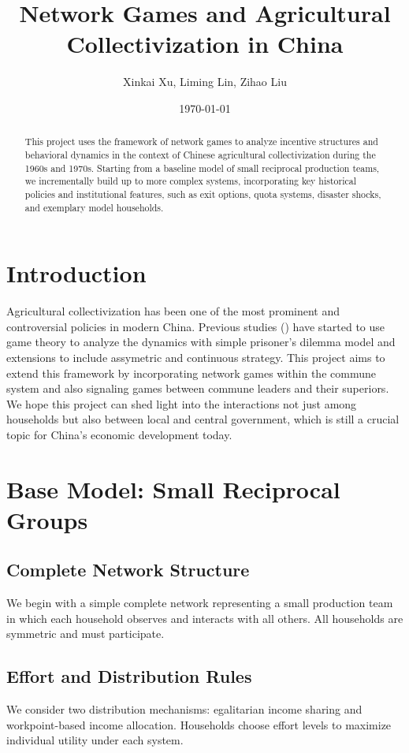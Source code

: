 \documentclass[12pt]{article}
\title{Network Games and Agricultural Collectivization in China}
\author{Xinkai Xu, Liming Lin, Zihao Liu}
\date{\today}
\begin{document}
\maketitle
\onehalfspacing

\begin{abstract}
This project uses the framework of network games to analyze incentive structures and behavioral dynamics in the context of Chinese agricultural collectivization during the 1960s and 1970s. Starting from a baseline model of small reciprocal production teams, we incrementally build up to more complex systems, incorporating key historical policies and institutional features, such as exit options, quota systems, disaster shocks, and exemplary model households.
\end{abstract}

\section{Introduction}
Agricultural collectivization has been one of the most prominent and controversial policies in modern China. Previous studies (\cite{chinnDiligenceLazinessChinese1980, nitzanDiligenceLazinessChinese1987}) have started to use game theory to analyze the dynamics with simple prisoner's dilemma model and extensions to include assymetric and continuous strategy. This project aims to extend this framework by incorporating network games within the commune system and also signaling games between commune leaders and their superiors. We hope this project can shed light into the interactions not just among households but also between local and central government, which is still a crucial topic for China's economic development today.
\section{Base Model: Small Reciprocal Groups}
\subsection{Complete Network Structure}
We begin with a simple complete network representing a small production team in which each household observes and interacts with all others. All households are symmetric and must participate.

\subsection{Effort and Distribution Rules}
We consider two distribution mechanisms: egalitarian income sharing and workpoint-based income allocation. Households choose effort levels to maximize individual utility under each system.
\end{document}
